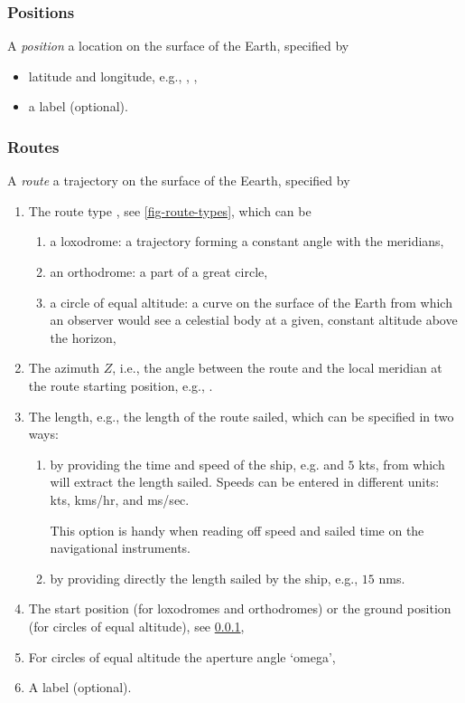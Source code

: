 \documentclass{ol-softwaremanual}
\begin{document}
\subsubsection{Positions}  \label{section-positions} 

A \textit{position} a  location on the surface of the Earth, specified by 
\begin{itemize}
\item latitude and longitude, e.g., , ,
\item a label (optional).
\end{itemize}
\subsubsection{Routes} \label{section-routes} 

A \textit{route} a trajectory on the surface of the Eearth, specified by 
\begin{enumerate}
  \item \label{item-route-type} The route type \cite{bowditch2002the}, see \cref{fig-route-types}, which can be 
  \begin{enumerate}
  \item a loxodrome: a trajectory forming a constant angle with the meridians,
  \item an orthodrome: a part of a great circle,
  \item  a circle of equal altitude: a curve on the surface of the Earth from which an observer would see a celestial \gls{body} at a given, constant altitude above the horizon,
  \end{enumerate}
  \item \label{item-route-azimuth} The azimuth $Z$, i.e., the angle between the route  and the local meridian at the route starting position, e.g., .
  \item \label{item-route-length} The length, e.g., the length of the route sailed, which can be specified in two ways:
  \begin{enumerate}
  \item by providing the time and speed of the ship, e.g.   and $5$ \acp{kt}, from which  \thel will extract the length sailed. Speeds can be entered in different units: \acp{kt}, \acp{km}/\ac{hr},  and \acp{m}/\ac{sec}. 
  
  This option is handy when reading off speed and sailed time  on the navigational instruments. 
  \item by providing directly the length sailed by the ship, e.g.,  $15$ \acp{nm}. 
  \end{enumerate}

  \item \label{item-route-reference-position} The start position (for loxodromes and orthodromes) or the ground position (for circles of equal altitude), see \cref{section-positions},
  \item \label{item-route-aperture} For circles of equal altitude the aperture angle `omega',
  \item \label{item-route-label} A label (optional). 
\end{enumerate}
\end{document}
